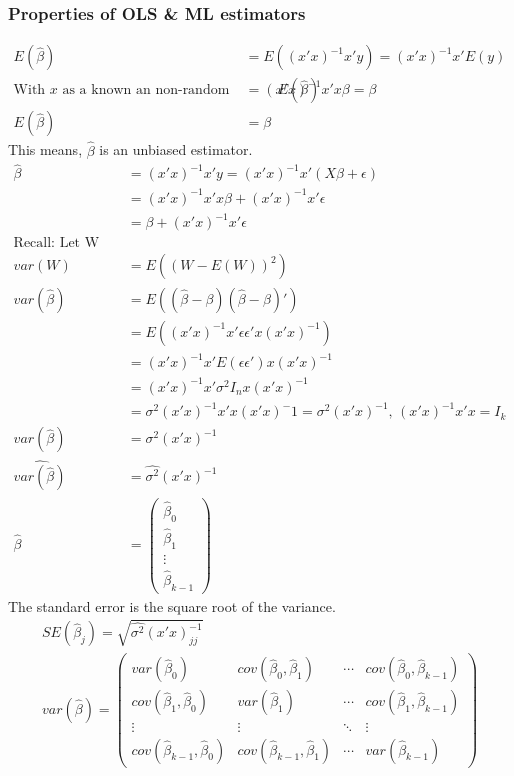 \subsubsection{Properties of OLS \& ML estimators}
		\begin{align*}
			E(\hat{\beta})&=E\left((x'x)^{-1}x'y\right)=(x'x)^{-1}x'E(y)\\ %
			\text{With }x\text{ as a known an non-random variable}
			E(\hat{\beta})&=(x'x)^{-1}x'x\beta=\beta\\
			E(\hat{\beta})&=\beta
		\end{align*}
		This means, $\hat{\beta}$ is an unbiased estimator.
		\begin{align*}
			\hat{\beta}&=(x'x)^{-1}x'y=(x'x)^{-1}x'(X\beta+\epsilon)\\
			&=(x'x)^{-1}x'x\beta+(x'x)^{-1}x'\epsilon\\
			&=\beta+(x'x)^{-1}x'\epsilon\\
			\text{Recall: Let W be a random variance. Then: }\\
			var(W)&=E\left((W-E(W))^2\right)\\
			var(\hat{\beta})&=E\left((\hat{\beta}-\beta)(\hat{\beta}-\beta)'\right)\\
			&=E\left((x'x)^{-1}x'\epsilon\epsilon'x(x'x)^{-1}\right)\\
			&=(x'x)^{-1}x'E(\epsilon\epsilon')x(x'x)^{-1}\\
			&=(x'x)^{-1}x'\sigma^2 I_n x(x'x)^{-1}\\
			&=\sigma^2 (x'x)^{-1}x'x(x'x)^-1=\sigma^2(x'x)^{-1},\,(x'x)^{-1}x'x=I_k\\
			var(\hat{\beta})&=\sigma^2(x'x)^{-1}\\
			\widehat{var(\hat{\beta})}&=\hat{\sigma^2}(x'x)^{-1}\\
			\hat{\beta}&=\begin{pmatrix}
				\hat{\beta}_0\\
				\hat{\beta}_1\\
				\vdots\\
				\hat{\beta}_{k-1}
			\end{pmatrix}
		\end{align*}
		The standard error is the square root of the variance.
		\begin{gather*}
			SE(\hat{\beta}_j)=\sqrt{\hat{\sigma^2}(x'x)^{-1}_{jj}}\\
			var(\hat{\beta})=\begin{pmatrix}
				var(\hat{\beta}_0)&cov(\hat{\beta}_0,\hat{\beta}_1)&\cdots&cov(\hat{\beta}_0,\hat{\beta}_{k-1})\\
				cov(\hat{\beta}_1,\hat{\beta}_0)&var(\hat{\beta}_1)&\cdots&cov(\hat{\beta}_1,\hat{\beta}_{k-1})\\
				\vdots&\vdots&\ddots&\vdots\\
				cov(\hat{\beta}_{k-1},\hat{\beta}_0)&cov(\hat{\beta}_{k-1},\hat{\beta}_1)&\cdots&var(\hat{\beta}_{k-1})
			\end{pmatrix}
		\end{gather*}

